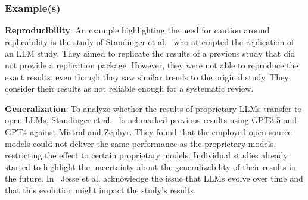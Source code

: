 
\subsubsection{Example(s)}
\textbf{Reproducibility}:
An example highlighting the need for caution around replicability is the study of Staudinger et al.~\cite{DBLP:conf/sigir-ap/StaudingerKPLH24} who attempted the replication of an LLM study. They aimed to replicate the results of a previous study that did not provide a replication package. However, they were not able to reproduce the exact results, even though they saw similar trends to the original study. They consider their results as not reliable enough for a systematic review.

\textbf{Generalization}:
To analyze whether the results of proprietary LLMs transfer to open LLMs, Staudinger et al.~\cite{DBLP:conf/sigir-ap/StaudingerKPLH24} benchmarked previous results using GPT3.5 and GPT4 against Mistral and Zephyr. They found that the employed open-source models could not deliver the same performance as the proprietary models, restricting the effect to certain proprietary models.
Individual studies already started to highlight the uncertainty about the generalizability of their results in the future. In~\cite{DBLP:conf/msr/JesseADM23} Jesse et al. acknowledge the issue that LLMs evolve over time and that this evolution might impact the study's results.

